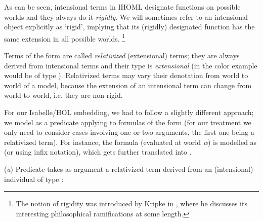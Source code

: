 \begin{isabellebody}
\begin{isamarkuptext}
 As can be seen, intensional terms in IHOML designate functions on possible worlds and they always do it \emph{rigidly}. 
 We will sometimes refer to an intensional object explicitly as `rigid', implying that its (rigidly) designated function has
 the same extension in all possible worlds. \footnote{The notion of rigidity was introduced by Kripke in \cite{kripke1980},
 where he discusses its interesting philosophical ramifications at some length.}%
\end{isamarkuptext}\isamarkuptrue%
%
\begin{isamarkuptext}%
Terms of the form \isa{{\isasymdown}{\isasymalpha}} are called \emph{relativized} (extensional) terms; they are always derived
from intensional terms and their type is \emph{extensional} (in the color example  would be of type \isa{{\isasymlangle}{\isasymzero}{\isasymrangle}}).
Relativized terms may vary their denotation from world to world of a model, because the extension of an intensional term can change
from world to world, i.e. they are non-rigid.%
\end{isamarkuptext}\isamarkuptrue%
%
\begin{isamarkuptext}%
For our Isabelle/HOL embedding, we had to follow a slightly different approach; we model \isa{{\isasymdown}}
as a predicate applying to formulas of the form  (for our treatment
we only need to consider cases involving one or two arguments, the first one being a relativized term).
For instance, the formula  (evaluated at world \emph{w}) is modelled as 
(or  using infix notation), which gets further translated into .%
\end{isamarkuptext}\isamarkuptrue%
%
\begin{isamarkuptext}%
(\emph{a}) Predicate \isa{{\isasymphi}} takes as argument a relativized term derived from an (intensional) individual of type \isa{{\isasymup}{\isasymzero}}:%
\end{isamarkuptext}\isamarkuptrue%

\end{isabellebody}
